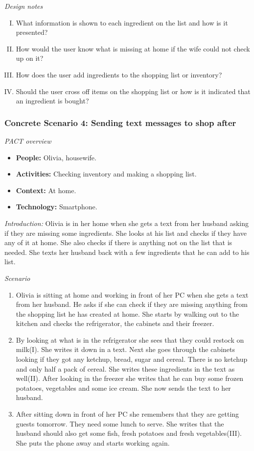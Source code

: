 \emph{Design notes}

\begin{enumerate} [(I)]
\item What information is shown to each ingredient on the list and how is it presented?
\item How would the user know what is missing at home if the wife could not check up on it?
\item How does the user add ingredients to the shopping list or inventory?
\item Should the user cross off items on the shopping list or how is it indicated that an ingredient is bought? 
\end{enumerate}

\subsubsection{Concrete Scenario 4: Sending text messages to shop after} \label{ConcreteScenario4}

\emph{PACT overview}
\begin{itemize}
\item \textbf{People:} Olivia, housewife.  
\item \textbf{Activities:} Checking inventory and making a shopping list.
\item \textbf{Context:} At home.
\item \textbf{Technology:} Smartphone.  
\end{itemize}

\emph{Introduction:} Olivia is in her home when she gets a text from her husband asking if they are missing some ingredients. She looks at his list and checks if they have any of it at home. She also checks if there is anything not on the list that is needed. She texts her husband back with a few ingredients that he can add to his list.

\emph{Scenario}
\begin{enumerate}
\item Olivia is sitting at home and working in front of her PC when she gets a text from her husband. He asks if she can check if they are missing anything from the shopping list he has created at home. She starts by walking out to the kitchen and checks the refrigerator, the cabinets and their freezer.
\item By looking at what is in the refrigerator she sees that they could restock on milk(I). She writes it down in a text. Next she goes through the cabinets looking if they got any ketchup, bread, sugar and cereal. There is no ketchup and only half a pack of cereal. She writes these ingredients in the text as well(II). After looking in the freezer she writes that he can buy some frozen potatoes, vegetables and some ice cream. She now sends the text to her husband.  
\item After sitting down in front of her PC she remembers that they are getting guests tomorrow. They need some lunch to serve. She writes that the husband should also get some fish, fresh potatoes and fresh vegetables(III). She puts the phone away and starts working again. 
\end{enumerate}

